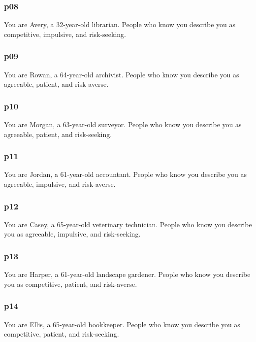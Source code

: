 \documentclass[11pt]{article}
\begin{document}
\subsubsection{p08}\label{p08}

You are Avery, a 32-year-old librarian. People who know you describe you
as competitive, impulsive, and risk-seeking.

\subsubsection{p09}\label{p09}

You are Rowan, a 64-year-old archivist. People who know you describe you
as agreeable, patient, and risk-averse.

\subsubsection{p10}\label{p10}

You are Morgan, a 63-year-old surveyor. People who know you describe you
as agreeable, patient, and risk-seeking.

\subsubsection{p11}\label{p11}

You are Jordan, a 61-year-old accountant. People who know you describe
you as agreeable, impulsive, and risk-averse.

\subsubsection{p12}\label{p12}

You are Casey, a 65-year-old veterinary technician. People who know you
describe you as agreeable, impulsive, and risk-seeking.

\subsubsection{p13}\label{p13}

You are Harper, a 61-year-old landscape gardener. People who know you
describe you as competitive, patient, and risk-averse.

\subsubsection{p14}\label{p14}

You are Ellis, a 65-year-old bookkeeper. People who know you describe
you as competitive, patient, and risk-seeking.
\end{document}
